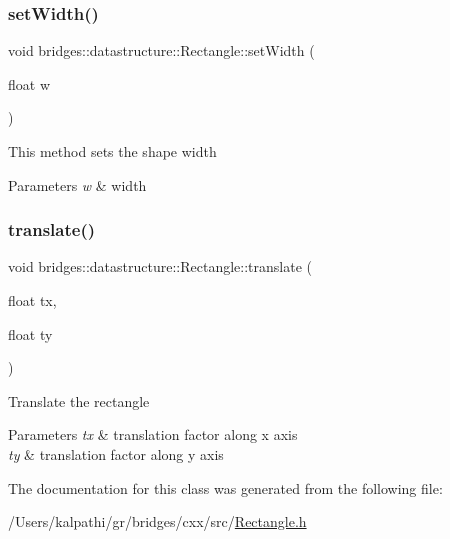 \mbox{\label{classbridges_1_1datastructure_1_1_rectangle_a7f6182e74816a6c7cf83ae49d5ed55be}} 
\subsubsection{\texorpdfstring{setWidth()}{setWidth()}}
{\footnotesize\ttfamily void bridges\+::datastructure\+::\+Rectangle\+::set\+Width (\begin{DoxyParamCaption}\item[{float}]{w }\end{DoxyParamCaption})\hspace{0.3cm}{\ttfamily [inline]}}

This method sets the shape width


\begin{DoxyParams}{Parameters}
{\em w} & width \\
\hline
\end{DoxyParams}
\mbox{\label{classbridges_1_1datastructure_1_1_rectangle_a910c2a92c38e2e13bde3f1fd51b17316}} 
\subsubsection{\texorpdfstring{translate()}{translate()}}
{\footnotesize\ttfamily void bridges\+::datastructure\+::\+Rectangle\+::translate (\begin{DoxyParamCaption}\item[{float}]{tx,  }\item[{float}]{ty }\end{DoxyParamCaption})\hspace{0.3cm}{\ttfamily [inline]}}

Translate the rectangle


\begin{DoxyParams}{Parameters}
{\em tx} & translation factor along x axis \\
\hline
{\em ty} & translation factor along y axis \\
\hline
\end{DoxyParams}


The documentation for this class was generated from the following file\+:\begin{DoxyCompactItemize}
\item 
/\+Users/kalpathi/gr/bridges/cxx/src/\mbox{\hyperlink{_rectangle_8h}{Rectangle.\+h}}\end{DoxyCompactItemize}
